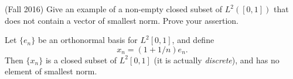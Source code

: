 \documentclass[answers]{exam}
\theoremstyle{problemstyle}
\newcommand{\vt}{\vskip 5mm} %
\newcommand{\norm}[1]{\left\lVert#1\right\rVert} %
\newcommand{\1}[1]{\textbf{1}_{\left[#1\right]}} %
\begin{document}
\begin{questions}
\item (Fall 2016)
  Give an example of a non-empty closed subset of $L^{2}([0,1])$ that does not contain a vector of smallest norm. Prove your assertion.

\begin{solution}
	Let $\{ e_n \}$ be an orthonormal basis for $L^2[0,1]$, and define
	\[ x_n = (1 + 1/n) e_n. \]
	Then $\{ x_n \}$ is a closed subset of $L^2[0,1]$ (it is actually \emph{discrete}), and has no element of smallest norm.

\begin{comment}
  Let $e_{n} = \sqrt{2}\sin(n\pi x)$ for $n=1,2,\ldots$, and define $x_{n}= \left(\frac{n+1}{n}\right)e_{n}$. Then $\{x_{n}\}_{n=1}$ is a nonempty closed subset with no element of smallest norm. To prove this, we first prove two claims:

  

  \vt
  \noindent \textit{Claim 1:} $\{e_{n}\}_{n\geq 1}$ is an orthonormal set in $L^{2}([0,1])$.
  \begin{proof}[Proof of Claim 1:]
    Need to show two things: (1) that $\norm{e_{n}}_{L^{2}([0,1])}=1$ for all $n$, and (2) that $\langle e_{n},e_{m}\rangle$ whenever $m\neq n$. These can be shown by direct computation using trig identities:

    Suppose $n\geq 1$. Then using $\sin^{2}(\theta) = \frac{1}{2}\left( 1-\cos(2\theta) \right)$,

    \begin{equation*}
      \norm{e_{n}}_{L^{2}([0,1])}^{2} = \int_{0}^{1}2\sin^{2}(n\pi x)dx = \int_{0}^{1}1-\cos(n\pi x)dx=1.
    \end{equation*}
    This proves (1).
    Next, suppose $m\neq n$. Using $\sin(A)\sin(B) = \frac{1}{2}\left(\cos(A-B)-\cos(A+B)  \right)$,
    \begin{align*}
      \langle e_{n},e_{m}\rangle
      &= \int_{0}^{1}2\sin(n\pi x)\sin(m\pi x)dx\\
      &= \int_{0}^{1} \cos((n-m)\pi x) - \cos((n+m)\pi x)dx\\
      &=0.
    \end{align*}
    This proves (2), which completes the proof of the claim.
  \end{proof}


\end{comment}
\end{solution}
\end{questions}
\end{document}
